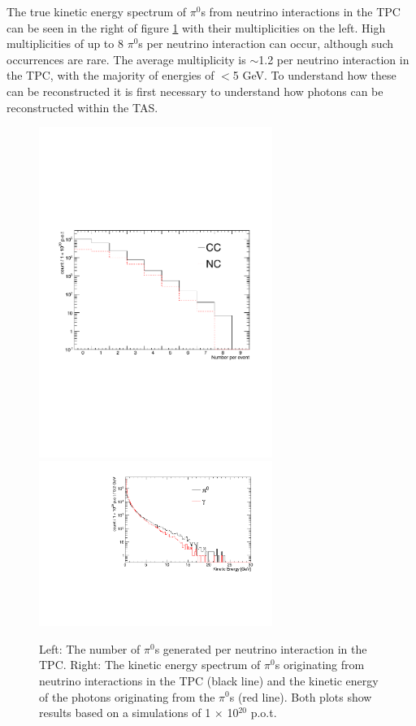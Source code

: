 The true kinetic energy spectrum of $\pi^{0}$s from neutrino interactions in the TPC can be seen in the right of figure \ref{fig:pi0KineticEnergy} with their multiplicities on the left. High multiplicities of up to 8 $\pi^{0}$s per neutrino interaction can occur, although such occurrences are rare. The average multiplicity is $\sim$1.2 per neutrino interaction in the TPC, with the majority of energies of $<$5 GeV. To understand how these can be reconstructed it is first necessary to understand how photons can be reconstructed within the TAS.

\begin{figure}[htbp]
\begin{center}
  	\includegraphics[width=76mm]{Chapter4/figures/piZeroMultiplicities.pdf}
  	\includegraphics[width=76mm]{Chapter4/figures/piZeroAndGammaKineticEnergy.pdf}
	\caption{Left: The number of $\pi^{0}$s generated per neutrino interaction in the TPC. Right: The kinetic energy spectrum of $\pi^{0}$s originating from neutrino interactions in the TPC (black line) and the kinetic energy of the photons originating from the $\pi^{0}$s (red line). Both plots show results based on a simulations of 1 $\times$ 10$^{20}$ p.o.t.}
	\label{fig:pi0KineticEnergy}
\end{center}
\end{figure}

